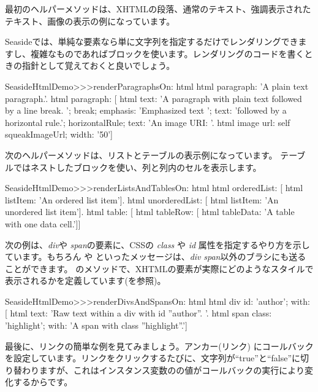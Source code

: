 \documentclass[a4paper,10pt,twoside]{book}
\begin{document}
最初のヘルパーメソッドは、XHTMLの段落、通常のテキスト、強調表示されたテキスト、画像の表示の例になっています。

Seasideでは、単純な要素なら単に文字列を指定するだけでレンダリングできますし、複雑なものであればブロックを使います。レンダリングのコードを書くときの指針として覚えておくと良いでしょう。

\begin{code}{}
SeasideHtmlDemo>>>renderParagraphsOn: html 
	html paragraph: 'A plain text paragraph.'.
	html paragraph: [
		html
			text: 'A paragraph with plain text followed by a line break. ';
			break;
			emphasis: 'Emphasized text ';
			text: 'followed by a horizontal rule.';
			horizontalRule;
			text: 'An image URI: '.
		html image
			url: self squeakImageUrl;
			width: '50']
\end{code}

次のヘルパーメソッドは、リストとテーブルの表示例になっています。 テーブルではネストしたブロックを使い、列と列内のセルを表示します。

\begin{code}{}
SeasideHtmlDemo>>>renderListsAndTablesOn: html 
	html orderedList: [
		html listItem: 'An ordered list item'].
	html unorderedList: [
		html listItem: 'An unordered list item'].
	html table: [
		html tableRow: [
			html tableData: 'A table with one data cell.']]
\end{code}

次の例は、\emph{div}や \emph{span}の要素に、CSSの \emph{class} や \emph{id} 属性を指定するやり方を示しています。もちろん
  や  といったメッセージは、\emph{div} \emph{span}以外のブラシにも送ることができます。
 のメソッドで、XHTMLの要素が実際にどのようなスタイルで表示されるかを定義しています(を参照)。

\begin{code}{}
SeasideHtmlDemo>>>renderDivsAndSpansOn: html 
	html div
		id: 'author';
		with: [
			html text: 'Raw text within a div with id ''author''. '.
			html span
				class: 'highlight';
				with: 'A span with class ''highlight''.']
\end{code}

最後に、リンクの簡単な例を見てみましょう。アンカー(リンク) にコールバックを設定しています。リンクをクリックするたびに、文字列が``true''と``false''に切り替わりますが、これはインスタンス変数のの値がコールバックの実行により変化するからです。
\end{document}
